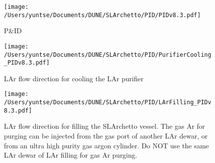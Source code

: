\documentclass[letterpaper,11pt]{article}
\begin{document}
\clearpage
\begin{figure}[htb]
\begin{center}
\texttt{[image: /Users/yuntse/Documents/DUNE/SLArchetto/PID/PIDv8.3.pdf]}
\caption{P\&ID}
\end{center}
\end{figure}
\clearpage
\begin{figure}[htb]
\begin{center}
\texttt{[image: /Users/yuntse/Documents/DUNE/SLArchetto/PID/PurifierCooling\_PIDv8.3.pdf]}
\caption{LAr flow direction for cooling the LAr purifier}
\end{center}
\end{figure}
\clearpage
\begin{figure}[htb]
\begin{center}
\texttt{[image: /Users/yuntse/Documents/DUNE/SLArchetto/PID/LArFilling\_PIDv8.3.pdf]}
\caption{LAr flow direction for filling the SLArchetto vessel.  The gas Ar for purging can be injected from the gas port 
of another LAr dewar, or from an ultra high purity gas argon cylinder.  Do NOT use the same LAr dewar of LAr filling 
for gas Ar purging.}
\end{center}
\end{figure}
\end{document}
